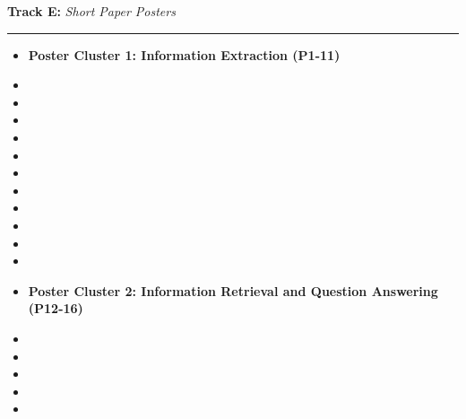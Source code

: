 \bigskip{}
\noindent \textbf{Track E:} \emph{Short Paper Posters} \hfill \emph{}\smallskip{}

\noindent \rule[0.5ex]{1\columnwidth}{1pt}
\begin{itemize}
\item []\textbf{Poster Cluster 1: Information Extraction (P1-11)}
\item {}
\item {}
\item {}
\item {}
\item {}
\item {}
\item {}
\item {}
\item {}
\item {}
\item {}
\item []\textbf{Poster Cluster 2: Information Retrieval and Question Answering (P12-16)}
\item {}
\item {}
\item {}
\item {}
\item {}
\end{itemize}

\clearpage
